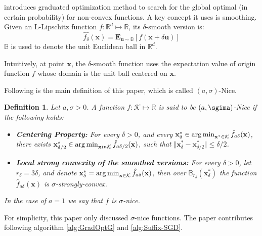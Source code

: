 \cite{Hazan2015} introduces  graduated optimization method to search for the global optimal (in certain probability) for non-convex functions. A key concept it uses is smoothing. Given an L-Lipschitz function $f: \mathbb{R}^d \mapsto \mathbb{R}$, its $\delta$-smooth version is:
$$
\hat{f_\delta}(\mathbf{x}) = \mathbf{E}_{\mathbf{u}\sim\mathbb{B}}[f(\mathbf{x}+\delta\mathbf{u})]
$$
$\mathbb{B}$ is used to denote the unit Euclidean ball in $\mathbb{R}^d$. 

Intuitively, at point $\mathbf{x}$, the $\delta$-smooth function uses the expectation value of origin function $f$ whose domain is the unit ball centered on $\mathbf{x}$.

Following is the main definition of this paper, which is called $(a, \sigma)$-Nice.
\newtheorem{sigma-Nice}{Definition}
\begin{sigma-Nice}
Let $a, \sigma > 0$. A function $f: \mathcal{K} \mapsto \mathbb{R}$ is said to be $(a, \sgima)$-Nice if the following holds:

\begin{itemize}
    \item \textbf{Centering Property:} For every $\delta > 0$, and every $\mathbf{x}^*_\delta \in \operatorname*{arg\,min}_{\mathbf{x}^* \in \mathcal{K}} \hat{f}_{a\delta}(\mathbf{x})$, there exists $\mathbf{x}^*_{\delta/2} \in \operatorname*{arg\,min}_{\mathbf{x} in \mathcal{K}} \hat{f}_{a\delta/2}(\mathbf{x})$, such that $\Vert\mathbf{x}^*_{\delta} - \mathbf{x}^*_{\delta/2}\Vert \leq \delta/2$.
    \item \textbf{Local strong convexity of the smoothed versions:} For every $\delta > 0 $, let $r_\delta = 3\delta$, and denote $\mathbf{x}^*_{\delta} = \operatorname*{arg\,min}_{\mathbf{x} \in \mathcal{K}} \hat{f}_{a\delta}(\mathbf{x})$, then over $\mathbb{B}_{r_\delta}(\mathbf{x}^*_{\delta})$ the function $\hat{f}_{a\delta}(\mathbf{x})$ is $\sigma$-strongly-convex.
\end{itemize}
In the case of $a=1$ we say that $f$ is $\sigma$-nice.
\end{sigma-Nice}

For simplicity, this paper only discussed $\sigma$-nice functions. The paper contributes following algorithm \ref{alg:GradOptG} and \ref{alg:Suffix-SGD}.

